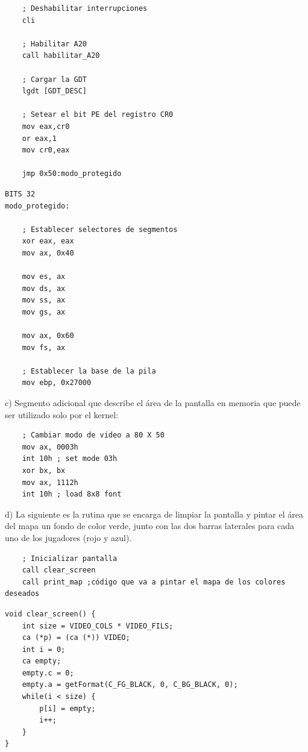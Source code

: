 \documentclass[a4paper]{article}
\begin{document}
\begin{codesnippet}
\begin{verbatim}
    ; Deshabilitar interrupciones
    cli
  
    ; Habilitar A20
    call habilitar_A20
	
    ; Cargar la GDT
    lgdt [GDT_DESC]

    ; Setear el bit PE del registro CR0
    mov eax,cr0
    or eax,1
    mov cr0,eax

    jmp 0x50:modo_protegido
\end{verbatim}
\end{codesnippet}
\begin{codesnippet}
\begin{verbatim}
BITS 32
modo_protegido:

    ; Establecer selectores de segmentos
    xor eax, eax
    mov ax, 0x40
     
    mov es, ax
    mov ds, ax
    mov ss, ax    
    mov gs, ax

    mov ax, 0x60 
    mov fs, ax
    
    ; Establecer la base de la pila
    mov ebp, 0x27000
\end{verbatim}
\end{codesnippet}

{\large c)} Segmento adicional que describe el \'area de la pantalla en memoria que puede
ser utilizado solo por el kernel:
\begin{codesnippet}
\begin{verbatim}
    ; Cambiar modo de video a 80 X 50
    mov ax, 0003h
    int 10h ; set mode 03h
    xor bx, bx
    mov ax, 1112h
    int 10h ; load 8x8 font
\end{verbatim}
\end{codesnippet}


{\large d)} La siguiente es la rutina que se encarga de limpiar la pantalla y pintar el \'area del mapa
un fondo de color verde, junto con las dos barras laterales para cada uno de
los jugadores (rojo y azul).
\begin{codesnippet}
\begin{verbatim}
    ; Inicializar pantalla
    call clear_screen
    call print_map ;código que va a pintar el mapa de los colores deseados
\end{verbatim}
\end{codesnippet}
\begin{codesnippet}
\begin{verbatim}
void clear_screen() {
    int size = VIDEO_COLS * VIDEO_FILS;    
    ca (*p) = (ca (*)) VIDEO; 
    int i = 0;
    ca empty;
    empty.c = 0;
    empty.a = getFormat(C_FG_BLACK, 0, C_BG_BLACK, 0);
    while(i < size) {
        p[i] = empty;
        i++;
    }
}
\end{verbatim}
\end{codesnippet}
\end{document}
